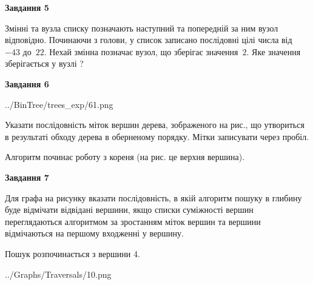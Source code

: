 \documentclass[12pt, ukrainian]{article}
\begin{document}
{\begin {large}
{\begin {center}\textbf{Завдання 5}\end {center}}\par
Змінні  та  вузла списку позначають наступний та попередній за ним вузол відповідно. Починаючи з голови, у список записано послідовні цілі числа від~$-43$ до~$22$. Нехай змінна  позначає вузол, що зберігає значення~$2$.
Яке значення зберігається у вузлі  ?\par
\newpage

{\begin {center}\textbf{Завдання 6}\end {center}}\par

\begin{center}
	{../BinTree/trees_exp/61.png}
\end{center}
Указати послідовність міток вершин дерева, зображеного на рис., що утвориться в результаті обходу дерева в оберненому порядку. Мітки записувати через пробіл.\par Алгоритм починає роботу з кореня (на рис. це верхня вершина).\par
\newpage

{\begin {center}\textbf{Завдання 7}\end {center}}\par
Для графа на рисунку вказати послідовність, в якій алгоритм пошуку в глибину буде відмічати відвідані вершини, якщо списки суміжності вершин переглядаються алгоритмом за зростанням міток вершин та вершини відмічаються на першому вход\-женні у вершину.\par
Пошук розпочинається з вершини 4.\par

\begin{center}
	{../Graphs/Traversals/10.png}
\end{center}\par
\newpage


\end{large}}
\end{document}
